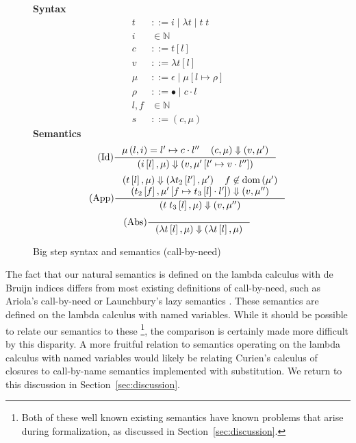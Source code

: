 \begin{figure}
\textbf{Syntax}
\begin{align*}
\tag{Term} t &::= i \; | \; \lambda t \; | \; t \; t  \\
\tag{Variable} i &\in \mathbb{N}  \\
\tag{Closure} c &::= t \left[l\right] \\
\tag{Value} v &::= \lambda t \left[l\right] \\
\tag{Heap} \mu &::= \epsilon \; | \; \mu \left[ l \mapsto \rho \right] \\
\tag{Environment} \rho &::= \bullet \; | \; c \cdot l \\
\tag{Location} l,f &\in \mathbb{N}  \\
\tag{Configuration} s &::= \left(c, \mu \right)
\end{align*}
\textbf{Semantics}
\begin{align*}
\tag{Id} \inference
{\mu \left( l, i \right) = l' \mapsto c \cdot l'' \quad 
 \left(c, \mu\right) \Downarrow \left(v, \mu'\right)}
{\left(i\left[l\right],\mu\right) \Downarrow \left(v, \mu'\left[l' \mapsto v \cdot l''\right]\right)}
\end{align*}
\begin{align*}
\tag{App} \inference
{\left(t\left[l\right], \mu\right) \Downarrow \left(\lambda t_2\left[l'\right], \mu'\right) 
   \quad f \not \in \textnormal{dom}\left(\mu'\right)
   \\ \left(t_2\left[f\right], \mu'\left[f \mapsto t_3\left[l\right] \cdot l'\right]\right)
         \Downarrow 
      \left(v, \mu'' \right) 
   }
{\left(t \; t_3\left[l\right], \mu\right) \Downarrow \left(v, \mu'' \right)}  
\end{align*}
\begin{align*}
\tag{Abs} \inference {} {\left(\lambda t\left[l\right], \mu\right) \Downarrow \left(\lambda t\left[l\right], \mu\right)}
\end{align*}
\caption{Big step \ce syntax and semantics (call-by-need)}
\label{fig:bigstep}
\end{figure}

The fact that our natural semantics is defined on the lambda calculus with de Bruijn
indices differs from most existing definitions of call-by-need, such as
Ariola's call-by-need \cite{ariola1995call} or Launchbury's lazy semantics
\cite{launchburynatural}. These semantics are defined on the lambda calculus with named
variables. While it should be possible to relate our semantics to these
\footnote{Both of these well known existing semantics have known problems that
arise during formalization, as discussed in Section~\ref{sec:discussion}.}, the
comparison is certainly made more difficult by this disparity. A more fruitful
relation to semantics operating on the lambda calculus with named variables would
likely be relating Curien's calculus of closures to call-by-name semantics
implemented with substitution. We return to this discussion in
Section~\ref{sec:discussion}.

